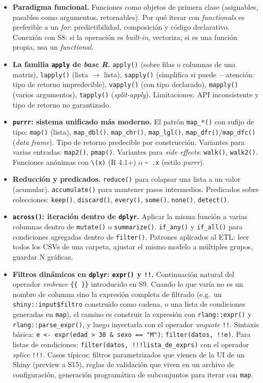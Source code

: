 \documentclass[11pt,letterpaper]{article}
\newcommand{\blue}[1]{{\color{cerulean}#1}}
\begin{document}
\begin{itemize}[leftmargin=*, itemsep=2pt]
    \item \textbf{Paradigma funcional.} Funciones como objetos de primera clase (asignables, pasables como argumentos, retornables). Por qué iterar con \textit{functionals} es preferible a un \textit{for}: predictibilidad, composición y código declarativo. Conexión con S8: si la operación es \textit{built-in}, vectoriza; si es una función propia, usa un \textit{functional}.
    \item \textbf{La familia \texttt{apply} de \textit{base R}.} \texttt{apply()} (sobre filas o columnas de una matriz), \texttt{lapply()} (lista $\to$ lista), \texttt{sapply()} (simplifica si puede ---atención: tipo de retorno impredecible), \texttt{vapply()} (con tipo declarado), \texttt{mapply()} (varios argumentos), \texttt{tapply()} (\textit{split-apply}). Limitaciones: API inconsistente y tipo de retorno no garantizado.
    \item \textbf{\texttt{purrr}: sistema unificado más moderno.} El patrón \texttt{map\_*()} con sufijo de tipo: \texttt{map()} (lista), \texttt{map\_dbl()}, \texttt{map\_chr()}, \texttt{map\_lgl()}, \texttt{map\_dfr()}/\texttt{map\_dfc()} (\textit{data frame}). Tipo de retorno predecible por construcción. Variantes para varias entradas: \texttt{map2()}, \texttt{pmap()}. Variantes para \textit{side effects}: \texttt{walk()}, \texttt{walk2()}. Funciones anónimas con \texttt{\textbackslash(x)} (R 4.1+) o \texttt{\textasciitilde{} .x} (estilo \textit{purrr}).
    \item \textbf{Reducción y predicados.} \texttt{reduce()} para colapsar una lista a un valor (acumular). \texttt{accumulate()} para mantener pasos intermedios. Predicados sobre colecciones: \texttt{keep()}, \texttt{discard()}, \texttt{every()}, \texttt{some()}, \texttt{none()}, \texttt{detect()}.
    \item \textbf{\texttt{across()}: iteración dentro de \texttt{dplyr}.} Aplicar la misma función a varias columnas dentro de \texttt{mutate()} o \texttt{summarize()}. \texttt{if\_any()} y \texttt{if\_all()} para condiciones agregadas dentro de \texttt{filter()}. Patrones aplicados al ETL: leer todos los CSVs de una carpeta, ajustar el mismo modelo a múltiples grupos, guardar N gráficas.
    \item \textbf{Filtros dinámicos en \texttt{dplyr}: \texttt{expr()} y \texttt{!!}.} Continuación natural del operador \textit{embrace} \texttt{\{\{~\}\}} introducido en S9. Cuando lo que varía no es un nombre de columna sino la \blue{expresión completa} de filtrado (e.g.\ un \texttt{shiny::input\$filtro} construido como cadena, o una lista de condiciones generadas en \texttt{map}), el camino es construir la expresión con \texttt{rlang::expr()} y \texttt{rlang::parse\_expr()}, y luego inyectarla con el operador \textit{unquote} \texttt{!!}. Sintaxis básica: \texttt{e <- expr(edad > 30 \& sexo == "M")}; \texttt{filter(datos, !!e)}. Para listas de condiciones: \texttt{filter(datos, !!!lista\_de\_exprs)} con el operador \textit{splice} \texttt{!!!}. Casos típicos: filtros parametrizados que vienen de la UI de un Shiny (preview a S15), reglas de validación que viven en un archivo de configuración, generación programática de subconjuntos para iterar con \texttt{map}.

\end{itemize}
\end{document}
